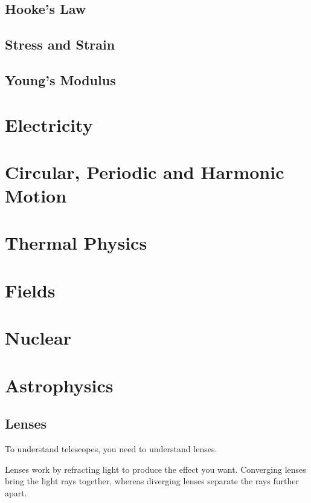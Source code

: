 \documentclass[a4paper, 12pt]{article}
\begin{document}
\subsection{Hooke's Law}

\subsection{Stress and Strain}

\subsection{Young's Modulus}


\newpage
\section{Electricity}

\newpage
\section{Circular, Periodic and Harmonic Motion}

\newpage
\section{Thermal Physics}

\newpage
\section{Fields}

\newpage
\section{Nuclear}

\newpage
\section{Astrophysics}

\subsection{Lenses}

To understand telescopes, you need to understand lenses.

Lenses work by refracting light to produce the effect you want. Converging lenses bring the light rays together, whereas diverging lenses separate the rays further apart.
\end{document}
